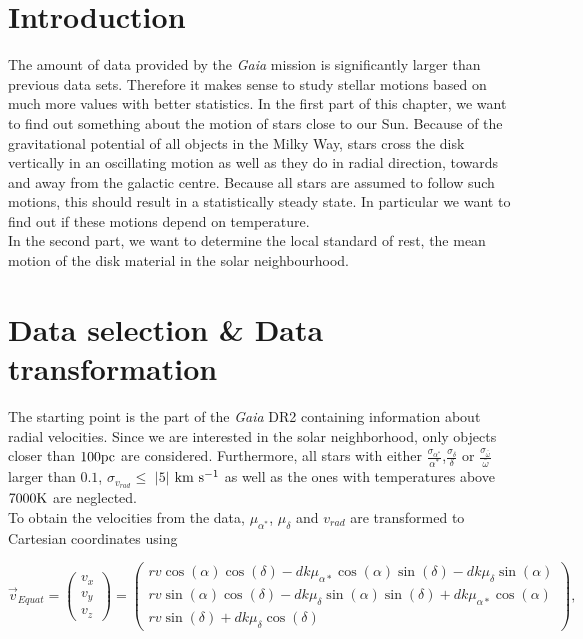 \documentclass{aastex62}
\begin{document}
	\section{Introduction}
	\noindent
	The amount of data provided by the \textit{Gaia} mission is significantly larger than previous data sets. Therefore it makes sense to study stellar motions based on much more values with better statistics. 
	\noindent
	In the first part of this chapter, we want to find out something about the motion of stars close to our Sun. Because of the gravitational potential of all objects in the Milky Way, stars cross the disk vertically in an oscillating motion as well as they do in radial direction, towards and away from the galactic centre. Because all stars are assumed to follow such motions, this should result in a statistically steady state. In particular we want to find out if these motions depend on temperature.
	\\
	In the second part, we want to determine the local standard of rest, the mean motion of the disk material in the solar neighbourhood.
	
	\section{Data selection \& Data transformation} 
	\noindent
	The starting point is the part of the \textit{Gaia} DR2 containing information about radial velocities. Since we are interested in the solar neighborhood, only objects closer than $100\rm pc$ are considered. Furthermore, all stars with either $\frac{\sigma_{\alpha^*}}{\alpha^*}$,$\frac{\sigma_{\delta}}{\delta}$ or $\frac{\sigma_{\bar{\omega}}}{\bar{\omega}}$ larger than $0.1$, $\sigma_{v_{rad}}\leq$ $|5|$ $\rm km~s^{-1}$ as well as the ones with temperatures above $7000\rm K$ are neglected.
	\\
	To obtain the velocities from the data, $\mu_{\alpha^*}$, $\mu_{\delta}$ and $v_{rad}$ are transformed to Cartesian coordinates using
	
	\begin{equation}
	\vec{v}_{Equat} = 
	\left(
	\begin{array}{c}
	v_x\\
	v_y\\
	v_z
	\end{array}
	\right) =
	\left(
	\begin{array}{c}
	rv \cos{(\alpha)} \cos{(\delta)} - d k \mu_{\alpha*} \cos{(\alpha)} \sin{(\delta)} - d k \mu_{\delta} \sin{(\alpha)}\\
	rv \sin{(\alpha)} \cos{(\delta)} - d k  \mu_{\delta} \sin{(\alpha)} \sin{(\delta)} + d k \mu_{\alpha*} \cos{(\alpha)}\\
	rv \sin{(\delta)} + d k \mu_{\delta} \cos{(\delta)}
	\end{array}
	\right),	
	\end{equation}
	
\end{document}
